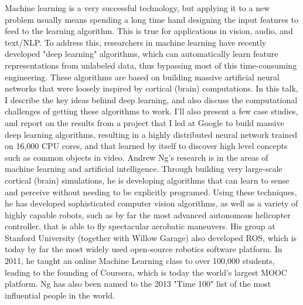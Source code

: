 {
Machine learning is a very successful technology, but applying it to a new problem usually means spending a long time hand designing the input features to feed to the learning algorithm. This is true for applications in vision, audio, and text/NLP. To address this, researchers in machine learning have recently developed "deep learning" algorithms, which can automatically learn feature representations from unlabeled data, thus bypassing most of this time-consuming engineering. These algorithms are based on building massive artificial neural networks that were loosely inspired by cortical (brain) computations. In this talk, I describe the key ideas behind deep learning, and also discuss the computational challenges of getting these algorithms to work. I'll also present a few case studies, and report on the results from a project that I led at Google to build massive deep learning algorithms, resulting in a highly distributed neural network trained on 16,000 CPU cores, and that learned by itself to discover high level concepts such as common objects in video.
}{
Andrew Ng's research is in the areas of machine learning and artificial intelligence. Through building very large-scale cortical (brain) simulations, he is developing algorithms that can learn to sense and perceive without needing to be explicitly programed. Using these techniques, he has developed sophisticated computer vision algorithms, as well as a variety of highly capable robots, such as by far the most advanced autonomous helicopter controller, that is able to fly spectacular aerobatic maneuvers. His group at Stanford University (together with Willow Garage) also developed ROS, which is today by far the most widely used open-source robotics software platform. In 2011, he taught an online Machine Learning class to over 100,000 students, leading to the founding of Coursera, which is today the world's largest MOOC platform. Ng has also been named to the 2013 "Time 100" list of the most influential people in the world.
}


